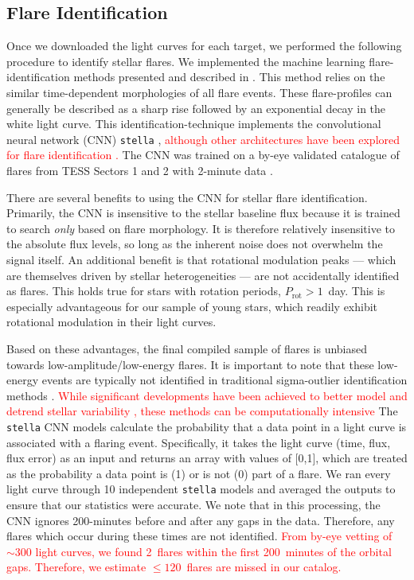 \documentclass[twocolumn, linenumbers]{aastex631}
\begin{document}
\subsection{Flare Identification}\label{subsec2:Flareidentification}

Once we downloaded the light curves for each target, we performed the following
procedure to identify stellar flares. We implemented the machine learning
flare-identification methods presented and described in \cite{feinstein20}.
This method relies on the similar time-dependent morphologies of all flare events.
These flare-profiles can generally be described as a sharp rise followed by an
exponential decay in the white light curve. This identification-technique implements
the convolutional neural network (CNN) \texttt{stella} \citep{feinstein20},
\textcolor{red}{although other architectures have been explored for flare identification
\citep[e.g.][]{vida18}.}  The CNN  was trained on a by-eye validated catalogue of flares
from TESS Sectors 1 and 2 with 2-minute data \citep{guenther19_flares}.

There are several benefits to using the CNN for stellar flare identification. Primarily,
the CNN is insensitive to the stellar baseline flux because it is trained to search
\textit{only} based on flare morphology. It is therefore relatively insensitive to
the absolute flux levels, so long as the inherent noise does not overwhelm the signal
itself. An additional benefit is that rotational modulation peaks --- which are
themselves driven by stellar heterogeneities --- are not accidentally identified as
flares. This holds true for stars with rotation periods, $P_\textrm{rot} > 1$~day.
This is especially advantageous for our sample of young stars, which readily exhibit
rotational modulation in their light curves.

Based on these advantages, the final compiled sample of flares is unbiased towards
low-amplitude/low-energy flares. It is important to note that these low-energy events
are typically not identified in traditional sigma-outlier identification
methods \textcolor{red}{\citep[e.g.][]{chang15, vasilyev22}}. \textcolor{red}{While
significant developments have been achieved to better model and detrend stellar
variability \citep[e.g.][]{bicz22}, these methods can be computationally intensive}
The \texttt{stella} CNN models calculate the probability that a data point in a light
curve is associated with a flaring event. Specifically, it takes the light curve (time,
flux, flux error) as an input and returns an array with values of [0,1], which are
treated as the probability a data point is (1) or is not (0) part of a flare. We ran
every light curve through 10 independent \texttt{stella} models and averaged the
outputs to ensure that our statistics were accurate. We note that in this processing,
the CNN ignores 200-minutes before and after any gaps in the data. Therefore, any
flares which occur during these times are not identified. \textcolor{red}{From by-eye
vetting of $\sim 300$ light curves, we found 2~flares within the first 200~minutes of
the orbital gaps. Therefore, we estimate $\leq 120$~flares are missed in our catalog.}
\end{document}
